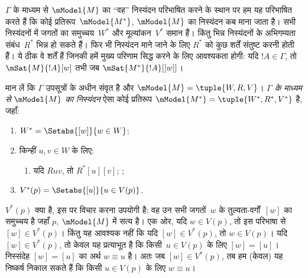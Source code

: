 \documentclass[../../../include/open-logic-section]{subfiles}
\begin{document}


$\Gamma$ के माध्यम से $\mModel{M}$ का ``वह'' निस्यंदन परिभाषित करने के
स्थान पर हम यह परिभाषित करते हैं कि कोई प्रतिरूप~$\mModel{M^*}$,
$\mModel{M}$ का निस्यंदन कब माना जाता है। सभी निस्यंदनों में जगतों का
समुच्चय~$W^*$ और मूल्यांकन~$V^*$ समान हैं। किंतु भिन्न निस्यंदनों के
अभिगम्यता संबंध~$R^*$ भिन्न हो सकते हैं। फिर भी निस्यंदन माने जाने के लिए
$R^*$ को कुछ शर्तें संतुष्ट करनी होती हैं। ये ठीक वे शर्तें हैं जिनकी हमें
मुख्य परिणाम सिद्ध करने के लिए आवश्यकता होगी: यदि $!A \in \Gamma$, तो
$\mSat{M}{!A}[w]$ तभी जब $\mSat{M^*}{!A}[{[w]}]$।

\begin{defn}
  मान लें कि $\Gamma$ उपसूत्रों के अधीन संवृत है और $\mModel{M} =
  \tuple{W, R, V}$। \emph{$\Gamma$ के माध्यम से $\mModel{M}$ का
  निस्यंदन} ऐसा कोई प्रतिरूप $\mModel{M^*} = \tuple{W^*,R^*,V^*}$ है,
  जहाँ:
  \begin{enumerate}
  \item $W^* = \Setabs{[w]}{w \in W}$;
  \item {}%
    किन्हीं $u,v \in W$ के लिए:
    \begin{enumerate}
    \item {}%
      यदि $Ruv$, तो $R^*[u][v]$;
    ;
    \end{enumerate}
  \item $V^*(p) = \Setabs{[u]}{u \in V(p)}$.
  \end{enumerate}
\end{defn}

$V^*(p)$ क्या है, इस पर विचार करना उपयोगी है: वह उन सभी जगतों~$w$ के
तुल्यता-वर्गों~$[w]$ का समुच्चय है जहाँ $p$, $\mModel{M}$ में सत्य है।
एक ओर, यदि $w \in V(p)$, तो इस परिभाषा से $[w] \in V^*(p)$। किंतु यह
आवश्यक नहीं कि यदि $[w] \in V^*(p)$, तो $w \in V(p)$। यदि $[w] \in
V^*(p)$, तो केवल यह प्रत्याभूत है कि किसी~$u \in V(p)$ के लिए $[w] =
[u]$। निस्संदेह $[w] = [u]$ का अर्थ $w \equiv u$ है। अतः जब $[w] \in
V^*(p)$, तब हम (केवल) यह निष्कर्ष निकाल सकते हैं कि किसी $u \in V(p)$
के लिए $w \equiv u$।
\end{document}
